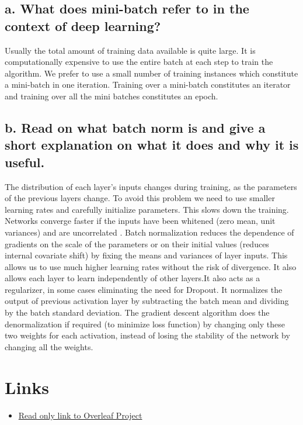 \documentclass{article}
\begin{document}
\subsection*{a. What does mini-batch refer to in the context of deep learning?}
Usually the total amount of training data available is quite large. It is computationally expensive to use the entire batch at each step to train the algorithm. We prefer to use a small number of training instances which constitute a mini-batch in one iteration. Training over a mini-batch constitutes an iterator and training over all the mini batches constitutes an epoch.


\subsection*{b. Read on what batch norm is and give a short explanation on what it does and
why it is useful.}
The distribution of each layer’s inputs changes during training, as the parameters of the previous layers change. To avoid this problem we need to use smaller learning rates and carefully initialize parameters. This slows down the training. Networks converge faster if the inputs have been whitened (zero mean, unit variances) and are uncorrelated \cite{Efficient_BackProp} \cite{NIPS2011_4421}. Batch normalization reduces the dependence of gradients on the scale of the parameters or on their initial values (reduces internal covariate shift) by fixing the means and variances of layer inputs. This allows us to use much higher learning rates without the risk of divergence. It also allows each layer to learn independently of other layers.It also acts as a regularizer, in some cases eliminating the need for Dropout.
It normalizes the output of previous activation layer by subtracting the batch mean and dividing by the batch standard deviation. The gradient descent algorithm does the denormalization if required (to minimize loss function) by changing only these two weights for each activation, instead of losing the stability of the network by changing all the weights.


\section*{Links}

\begin{itemize}
    \item \href{https://www.overleaf.com/read/rpbsgtxdycmx}{Read only link to Overleaf Project}
\end{itemize}



\end{document}
